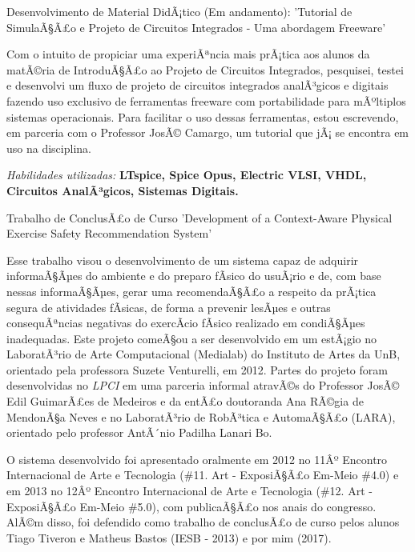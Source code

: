 \documentclass[a4paper]{twentysecondcv} %
\begin{document}
\begin{twenty}
\twentyitem
{Desenvolvimento de Material DidÃ¡tico (Em andamento):}
{'Tutorial de SimulaÃ§Ã£o e Projeto de Circuitos Integrados - Uma abordagem Freeware'}
{}
{\hspace{8pt} Com o intuito de propiciar uma experiÃªncia mais prÃ¡tica aos alunos da matÃ©ria de IntroduÃ§Ã£o ao Projeto de Circuitos Integrados, pesquisei, testei e desenvolvi um fluxo de projeto de circuitos integrados analÃ³gicos e digitais fazendo uso exclusivo de ferramentas freeware com portabilidade para mÃºltiplos sistemas operacionais. Para facilitar o uso dessas ferramentas, estou escrevendo, em parceria com o Professor JosÃ© Camargo, um tutorial que jÃ¡ se encontra em uso na disciplina.

\hspace{8pt}\textit{Habilidades utilizadas:} \textbf{LTspice, Spice Opus, Electric VLSI, VHDL, Circuitos AnalÃ³gicos, Sistemas Digitais.\\}}

\twentyitem
{Trabalho de ConclusÃ£o de Curso}
{'Development of a Context-Aware Physical Exercise Safety Recommendation System'}
{}
{\hspace{8pt}Esse trabalho visou o desenvolvimento de um sistema capaz de adquirir informaÃ§Ãµes do ambiente e do preparo fÃ­sico do usuÃ¡rio e de, com base nessas informaÃ§Ãµes, gerar uma recomendaÃ§Ã£o a respeito da prÃ¡tica segura de atividades fÃ­sicas, de forma a prevenir lesÃµes e outras consequÃªncias negativas do exercÃ­cio fÃ­sico realizado em condiÃ§Ãµes inadequadas. Este projeto comeÃ§ou a ser desenvolvido em um estÃ¡gio no LaboratÃ³rio de Arte Computacional (Medialab) do Instituto de Artes da UnB, orientado pela professora Suzete Venturelli, em 2012. Partes do projeto foram desenvolvidas no \textit{LPCI} em uma parceria informal atravÃ©s do Professor JosÃ© Edil GuimarÃ£es de Medeiros e da entÃ£o doutoranda Ana RÃ©gia de MendonÃ§a Neves e no LaboratÃ³rio de RobÃ³tica e AutomaÃ§Ã£o (LARA), orientado pelo professor AntÃ´nio Padilha Lanari Bo.

\hspace{8pt}O sistema desenvolvido foi apresentado oralmente em 2012 no 11Âº Encontro Internacional de Arte e Tecnologia (\#11. Art - ExposiÃ§Ã£o Em-Meio \#4.0) e em 2013 no 12Âº Encontro Internacional de Arte e Tecnologia (\#12. Art - ExposiÃ§Ã£o Em-Meio \#5.0), com publicaÃ§Ã£o nos anais do congresso. AlÃ©m disso, foi defendido como trabalho de conclusÃ£o de curso pelos alunos Tiago Tiveron e Matheus Bastos (IESB - 2013) e por mim (2017).

}
\end{twenty}
\end{document}

